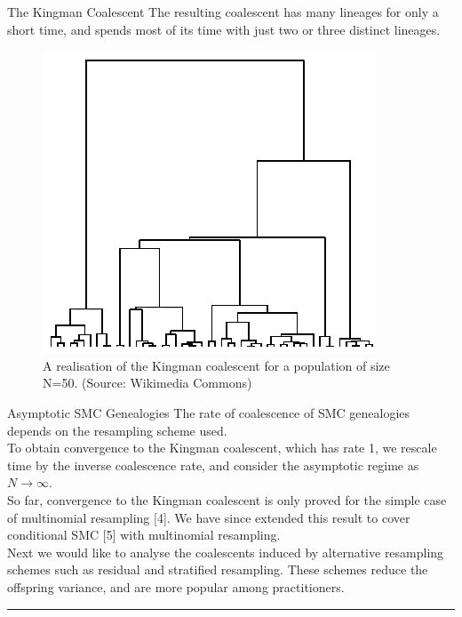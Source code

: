 \documentclass[final, 12pt]{beamer}
\newlength{\colwidth}
\begin{document}
\begin{frame}
\begin{columns}
\begin{column}{\colwidth}
\begin{block}{The Kingman Coalescent}
The resulting coalescent has many lineages for only a short time, and spends most of its time with just two or three distinct lineages.
\begin{figure}
\includegraphics[width=0.8\colwidth]{kingman.png}
\caption{A realisation of the Kingman coalescent for a population of size N=50. \textmd{(Source: Wikimedia Commons)}}
\end{figure}
\end{block}

\begin{block}{Asymptotic SMC Genealogies}
The rate of coalescence of SMC genealogies depends on the resampling scheme used. \\[10pt]

To obtain convergence to the Kingman coalescent, which has rate 1, we rescale time by the inverse coalescence rate, and consider the asymptotic regime as  $N\to\infty$.\\[10pt]

So far, convergence to the Kingman coalescent is only proved for the simple case of multinomial resampling [4]. We have since extended this result to cover conditional SMC [5] with multinomial resampling.\\[10pt]

Next we would like to analyse the coalescents induced by alternative resampling schemes such as residual and stratified resampling. These schemes reduce the offspring variance, and are more popular among practitioners.
\end{block}

\vspace*{50pt}

\hrule
\begin{block}


\end{block}
\end{column}
\end{columns}
\end{frame}
\end{document}
